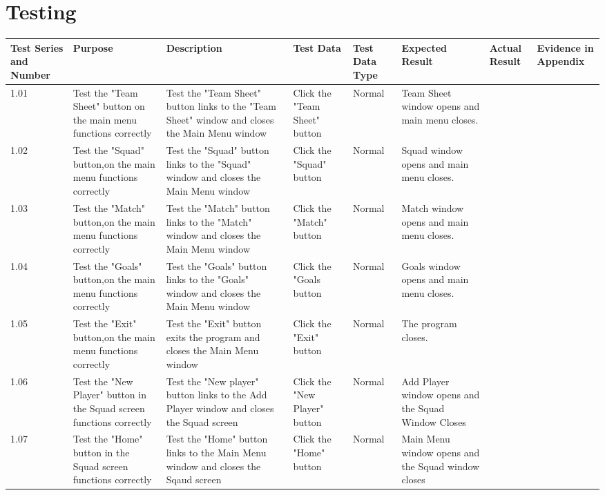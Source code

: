 \section{Testing}

\begin{table}[]
\label{my-label}
\begin{longtable}{|p{1cm}|p{2.5cm}|p{2.5cm}|p{1.5cm}|p{1.5cm}|p{2cm}|p{1cm}|p{1cm}|}

\hline
Test Series and Number & Purpose & Description & Test Data & Test Data Type & Expected Result & Actual Result & Evidence in Appendix \\ \hline
1.01 & Test the "Team Sheet" button on the main menu functions correctly & Test the "Team Sheet" button links to the "Team Sheet" window and closes the Main Menu window & Click the "Team Sheet" button & Normal & Team Sheet window opens and main menu closes. &  &  \\ \hline
1.02 & Test the "Squad" button,on the main menu functions correctly & Test the "Squad" button links to the "Squad" window and closes the Main Menu window & Click the "Squad" button & Normal & Squad window opens and main menu closes. &  &  \\ \hline
1.03 & Test the "Match" button,on the main menu functions correctly & Test the "Match" button links to the "Match" window and closes the Main Menu window & Click the "Match" button & Normal & Match window opens and main menu closes. &  &  \\ \hline
1.04 & Test the "Goals" button,on the main menu functions correctly & Test the "Goals" button links to the "Goals" window and closes the Main Menu window & Click the "Goals button & Normal & Goals window opens and main menu closes. &  &  \\ \hline
1.05 & Test the "Exit" button,on the main menu functions correctly & Test the "Exit" button exits the program and closes the Main Menu window & Click the "Exit" button & Normal & The program closes. &  &  \\ \hline
1.06 & Test the "New Player" button in the Squad screen functions correctly & Test the "New player" button links to the Add Player window and closes the Squad screen & Click the "New Player" button & Normal & Add Player window opens and the Squad Window Closes &  &  \\ \hline
1.07 & Test the "Home" button in the Squad screen functions correctly & Test the "Home" button links to the Main Menu window and closes the Sqaud screen & Click the "Home" button & Normal & Main Menu window opens and the Squad window closes &  &  \\ \hline

\end{longtable}
\end{table}
